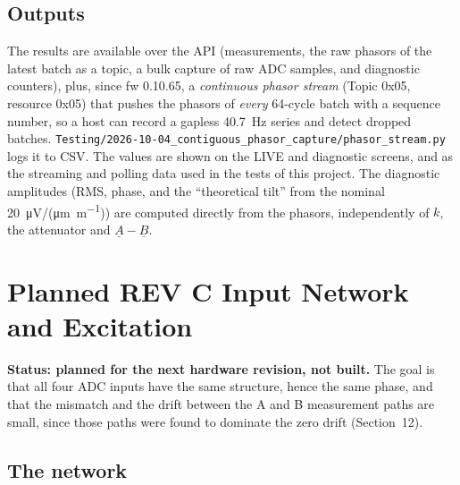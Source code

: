 \documentclass[11pt,a4paper]{article}
\begin{document}
\subsection{Outputs}

The results are available over the API (measurements, the raw phasors of
the latest batch as a topic, a bulk capture of raw ADC samples, and diagnostic counters), plus, since fw 0.10.65, a
\emph{continuous phasor stream} (Topic 0x05, resource 0x05) that pushes the
phasors of \emph{every} 64-cycle batch with a sequence number, so a host can
record a gapless \SI{40.7}{\hertz} series and detect dropped batches.
\nolinkurl{Testing/2026-10-04_contiguous_phasor_capture/phasor_stream.py} logs
it to CSV.  The values are shown on the LIVE and diagnostic
screens, and as the streaming and polling data used in the tests of this
project.  The diagnostic amplitudes (RMS, phase, and the ``theoretical
tilt'' from the nominal \SI{20}{\micro\volt}/(\si{\micro\metre\per\metre}))
are computed directly from the phasors, independently of $k$, the
attenuator and $\underline{A}-\underline{B}$.

\section{Planned REV C Input Network and Excitation}

\textbf{Status: planned for the next hardware revision, not built.}  The goal is that
all four ADC inputs have the same structure, hence the same phase, and that the
mismatch and the drift between the A and B measurement paths are small, since those
paths were found to dominate the zero drift (Section~12).

\subsection{The network}
\end{document}
